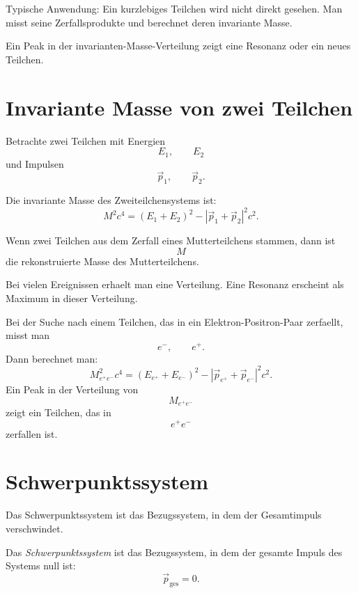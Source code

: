 \begin{examtipbox}
Typische Anwendung:
Ein kurzlebiges Teilchen wird nicht direkt gesehen.
Man misst seine Zerfallsprodukte und berechnet deren invariante Masse.

Ein Peak in der invarianten-Masse-Verteilung zeigt eine Resonanz oder ein neues
Teilchen.
\end{examtipbox}

\section{Invariante Masse von zwei Teilchen}

Betrachte zwei Teilchen mit Energien
\[
    E_1,\qquad E_2
\]
und Impulsen
\[
    \vec p_1,\qquad \vec p_2.
\]

\begin{formulabox}
Die invariante Masse des Zweiteilchensystems ist:
\[
    M^2c^4
    =
    (E_1+E_2)^2
    -
    \left|\vec p_1+\vec p_2\right|^2c^2.
\]
\end{formulabox}

\begin{conceptbox}
Wenn zwei Teilchen aus dem Zerfall eines Mutterteilchens stammen, dann ist
\[
    M
\]
die rekonstruierte Masse des Mutterteilchens.

Bei vielen Ereignissen erhaelt man eine Verteilung.
Eine Resonanz erscheint als Maximum in dieser Verteilung.
\end{conceptbox}

\begin{examplebox}
Bei der Suche nach einem Teilchen, das in ein Elektron-Positron-Paar zerfaellt,
misst man
\[
    e^-,
    \qquad
    e^+.
\]
Dann berechnet man:
\[
    M_{e^+e^-}^2c^4
    =
    (E_{e^+}+E_{e^-})^2
    -
    \left|\vec p_{e^+}+\vec p_{e^-}\right|^2c^2.
\]
Ein Peak in der Verteilung von
\[
    M_{e^+e^-}
\]
zeigt ein Teilchen, das in
\[
    e^+e^-
\]
zerfallen ist.
\end{examplebox}

\section{Schwerpunktssystem}

Das Schwerpunktssystem ist das Bezugssystem, in dem der Gesamtimpuls verschwindet.

\begin{definitionbox}
Das \emph{Schwerpunktssystem} ist das Bezugssystem, in dem der gesamte Impuls des
Systems null ist:
\[
    \vec p_{\mathrm{ges}}=0.
\]
\end{definitionbox}

